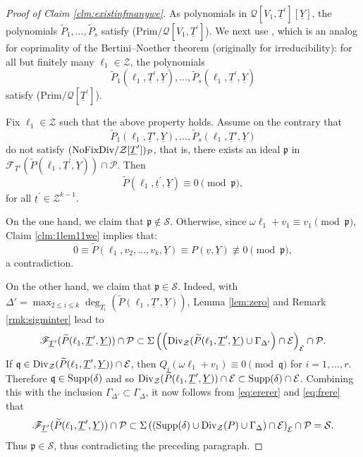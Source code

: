 \documentclass[11pt,a4paper,reqno]{amsart}
\theoremstyle{definition}
\begin{document}
\begin{proof}[Proof of Claim \ref{clm:existinfmanywe}]

As polynomials in $\mathcal{Q}[V_1,\underline{T}^\prime][\underline{Y}]$, the polynomials $\widetilde P_1,\ldots, \widetilde P_s$ satisfy (Prim$/{\mathcal Q}[V_1,\underline T^\prime]$). We next use \cite[Proposition 3.1]{BD22}, which is an analog for coprimality of the Bertini--Noether theorem  (originally for irreducibility): for all but finitely many $\ell_1\in \mathcal{Z}$, the polynomials $$\widetilde{P}_1(\ell_1,\underline{T}^\prime,\underline{Y}),\dots,\widetilde{P}_s(\ell_1,\underline{T}^\prime,\underline{Y})$$ satisfy (Prim$/{\mathcal Q}[\underline T^\prime]$).

Fix $\ell_1\in \mathcal{Z}$ such that the above property holds. Assume on the contrary that 
$$
\widetilde{P}_1(\ell_1,\underline{T}',\underline{Y}),\dots,\widetilde{P}_s(\ell_1,\underline{T}',\underline{Y})
$$ do not satisfy $\hbox{\rm (NoFixDiv}/{\mathcal Z}[\underline T^\prime])_{\mathcal P}$, that is, there exists an ideal $\mathfrak{p}$ in $\mathcal{F}_{\underline{T}'}(\widetilde{P}(\ell_1,\underline{T}^\prime,\underline{Y})) \cap \mathcal{P}$. Then $$\widetilde{P}(\ell_1, \underline{t}^\prime, \underline{Y}) \equiv 0 \pmod{\mathfrak{p}},$$ for all $\underline{t}^\prime \in \mathcal{Z}^{k-1}$. 

On the one hand, we claim that $\mathfrak{p} \notin \mathcal{S}$. Otherwise, since $\omega\ell_1+v_1 \equiv v_1 \pmod{\mathfrak{p}}$, Claim \ref{clm:1lem11we} implies that: 
$$
0\equiv \widetilde{P}(\ell_1,v_2,\dots,v_k,\underline{Y})\equiv P(\underline{v},\underline{Y}) \not \equiv 0 \pmod{\mathfrak{p}},
$$ a contradiction.

On the other hand, we claim that $\mathfrak{p} \in \mathcal{S}$. Indeed, with $\Delta'=\max_{2 \leq i \leq k}\deg_{T_i}(\widetilde{P}(\ell_1, \underline{T}',\underline{Y}))$, Lemma \ref{lem:zero} and Remark \ref{rmk:sigminter} lead to 
\begin{equation}\label{eq:frere}
    \mathscr{F}_{\underline{T}'}(\widetilde{P}(\ell_1,\underline{T}',\underline{Y})) \cap \mathcal{P} \subset \Sigma\left(\left({\rm Div}_{\mathcal{Z}}(\widetilde{P}(\ell_1,\underline{T}',\underline{Y}) \cup \Gamma_{\Delta'}\right) \cap \mathcal{E}\right)_{\mathcal{E}}\cap \mathcal{P}.
\end{equation}
\noindent
If $\mathfrak{q} \in {\rm Div}_{\mathcal{Z}}(\widetilde{P}(\ell_1,\underline{T}',\underline{Y})) \cap \mathcal{E}$, then $Q_{i}(\omega \ell_1+v_1) \equiv 0 \pmod{\mathfrak{q}}$ for $i=1,\ldots,r$. Therefore $\mathfrak{q} \in {\rm Supp}(\delta)$ and so 
${\rm Div}_{\mathcal{Z}}(\widetilde{P}(\ell_1,\underline{T}',\underline{Y})) \cap \mathcal{E} \subset {\rm Supp}(\delta) \cap \mathcal{E}
$. Combining this with the inclusion $
\Gamma_{\Delta'} \subset \Gamma_{\Delta}$, it now follows from \eqref{eq:ererer} and \eqref{eq:frere} that
$$
\mathscr{F}_{\underline{T}'}(\widetilde{P}(\ell_1,\underline{T}',\underline{Y})) \cap \mathcal{P} \subset  \Sigma\left(({\rm Supp}(\delta) \cup {\rm Div}_{\mathcal{Z}}(P) \cup \Gamma_\Delta) \cap \mathcal{E}\right)_{\mathcal{E}} \cap \mathcal{P}=\mathcal{S}.
$$ Thus $\mathfrak{p} \in \mathcal{S}$, thus contradicting the preceding paragraph. 


\end{proof}
\end{document}
